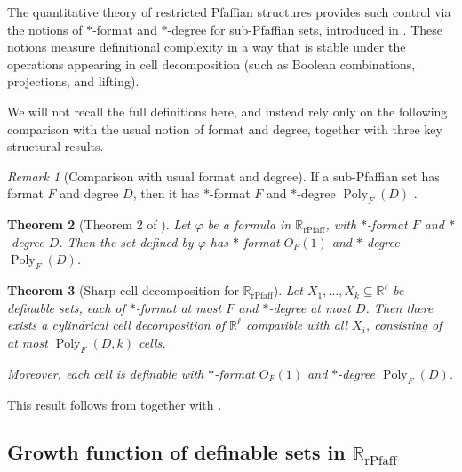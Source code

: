 \documentclass[11pt]{article}
\theoremstyle{plain}
\newtheorem{theorem}{Theorem}[section]
\theoremstyle{definition}
\theoremstyle{remark}
\newtheorem{remark}[theorem]{Remark}
\newcommand{\R}{\mathbb{R}}
\newcommand{\Poly}{\operatorname{Poly}}
\newcommand{\rPfaff}{\operatorname{rPfaff}}
\begin{document}
\medskip

The quantitative theory of restricted Pfaffian structures provides such
control via the notions of \(*\)-format and \(*\)-degree for sub-Pfaffian
sets, introduced in \cite{binyamini2020effective}. These notions measure
definitional complexity in a way that is stable under the operations
appearing in cell decomposition (such as Boolean combinations,
projections, and lifting).

We will not recall the full definitions here, and instead rely only on the
following comparison with the usual notion of format and degree, together
with three key structural results.

\begin{remark}[Comparison with usual format and degree]
\label{rem:usual-to-star}
If a sub-Pfaffian set has format \(F\) and degree \(D\), then it has
\(*\)-format \(F\) and \(*\)-degree \(\Poly_F(D)\)
\cite[Remark~10]{BinyaminiNovikovZak2024WilkiePfaffian}.
\end{remark}

\begin{theorem}[Theorem 2 of \cite{binyamini2020effective}]
\label{thm:formula-to-star}
Let \(\varphi\) be a formula in \(\R_{\rPfaff}\), with \(*\)-format
\(F\) and \(*\)-degree \(D\). Then the set defined by \(\varphi\) has
\(*\)-format \(O_F(1)\) and \(*\)-degree \(\Poly_F(D)\).
\end{theorem}

\begin{theorem}[Sharp cell decomposition for \(\R_{\rPfaff}\)]
\label{thm:sharp-cd-rpfaff}
Let \(X_1,\ldots,X_k \subseteq \R^\ell\) be definable sets, each of
\(*\)-format at most \(F\) and \(*\)-degree at most \(D\).
Then there exists a cylindrical cell decomposition of \(\R^\ell\)
compatible with all \(X_i\), consisting of at most \(\Poly_F(D,k)\) cells.

Moreover, each cell is definable with \(*\)-format \(O_F(1)\) and
\(*\)-degree \(\Poly_F(D)\).
\end{theorem}

This result follows from
\cite[Theorem 1]{binyamini2020effective} together with
\cite[Remark 10]{BinyaminiNovikovZak2024WilkiePfaffian}.


\subsection{\texorpdfstring{Growth function of definable sets in $\R_{\rPfaff}$}{Growth function of definable sets in R rPfaff}}
\label{app:rPfaff-growth-function}
\end{document}
